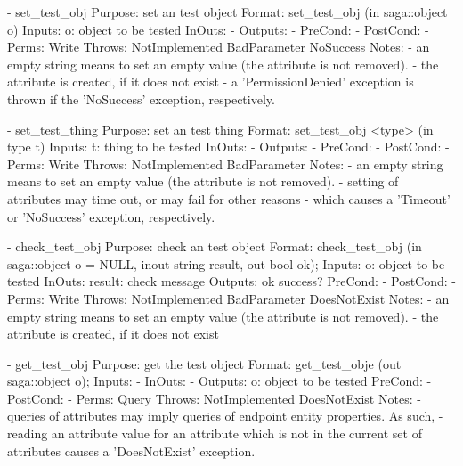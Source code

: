  \begin{myspec}
    - set_test_obj
      Purpose:  set an test object
      Format:   set_test_obj         (in saga::object o)
      Inputs:   o:                    object to be tested
      InOuts:   -
      Outputs:  -
      PreCond:  -
      PostCond: -
      Perms:    Write
      Throws:   NotImplemented
                BadParameter
                NoSuccess
      Notes:    - an empty string means to set an empty value
                  (the attribute is not removed).
                - the attribute is created, if it does not exist
                - a 'PermissionDenied' exception is thrown if the
                  'NoSuccess' exception, respectively.
 
 
    - set_test_thing
      Purpose:  set an test thing
      Format:   set_test_obj <type>  (in type         t)
      Inputs:   t:                    thing to be tested
      InOuts:   -
      Outputs:  -
      PreCond:  -
      PostCond: -
      Perms:    Write
      Throws:   NotImplemented
                BadParameter
      Notes:    - an empty string means to set an empty value
                  (the attribute is not removed).
                - setting of attributes may time out, or may fail
                  for other reasons - which causes a 'Timeout' or
                  'NoSuccess' exception, respectively.
 
 
    - check_test_obj
      Purpose:  check an test object
      Format:   check_test_obj         (in    saga::object o = NULL,
                                        inout string    result,
                                        out   bool      ok);
      Inputs:   o:                    object to be tested
      InOuts:   result:               check message
      Outputs:  ok                    success?
      PreCond:  -
      PostCond: -
      Perms:    Write
      Throws:   NotImplemented
                BadParameter
                DoesNotExist
      Notes:    - an empty string means to set an empty value
                  (the attribute is not removed).
                - the attribute is created, if it does not exist
 
 
    - get_test_obj
      Purpose:  get the test object
      Format:   get_test_obje        (out saga::object o);
      Inputs:   -
      InOuts:   -
      Outputs:  o:                    object to be tested
      PreCond:  -
      PostCond: -
      Perms:    Query
      Throws:   NotImplemented
                DoesNotExist
      Notes:    - queries of attributes may imply queries of
                  endpoint entity properties.  As such,
                - reading an attribute value for an attribute
                  which is not in the current set of attributes
                  causes a 'DoesNotExist' exception.
 \end{myspec}
 

